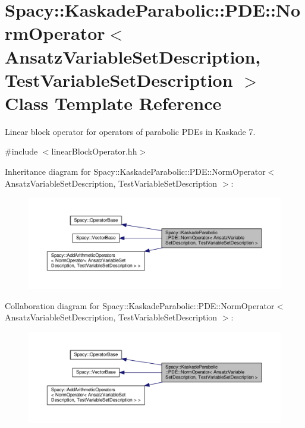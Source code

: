 \hypertarget{classSpacy_1_1KaskadeParabolic_1_1PDE_1_1NormOperator}{\section{Spacy\-:\-:Kaskade\-Parabolic\-:\-:P\-D\-E\-:\-:Norm\-Operator$<$ Ansatz\-Variable\-Set\-Description, Test\-Variable\-Set\-Description $>$ Class Template Reference}
\label{classSpacy_1_1KaskadeParabolic_1_1PDE_1_1NormOperator}
}


Linear block operator for operators of parabolic P\-D\-Es in Kaskade 7.  




{\ttfamily \#include $<$linear\-Block\-Operator.\-hh$>$}



Inheritance diagram for Spacy\-:\-:Kaskade\-Parabolic\-:\-:P\-D\-E\-:\-:Norm\-Operator$<$ Ansatz\-Variable\-Set\-Description, Test\-Variable\-Set\-Description $>$\-:
\nopagebreak
\begin{figure}[H]
\begin{center}
\leavevmode
\includegraphics[width=350pt]{classSpacy_1_1KaskadeParabolic_1_1PDE_1_1NormOperator__inherit__graph}
\end{center}
\end{figure}


Collaboration diagram for Spacy\-:\-:Kaskade\-Parabolic\-:\-:P\-D\-E\-:\-:Norm\-Operator$<$ Ansatz\-Variable\-Set\-Description, Test\-Variable\-Set\-Description $>$\-:
\nopagebreak
\begin{figure}[H]
\begin{center}
\leavevmode
\includegraphics[width=350pt]{classSpacy_1_1KaskadeParabolic_1_1PDE_1_1NormOperator__coll__graph}
\end{center}
\end{figure}
